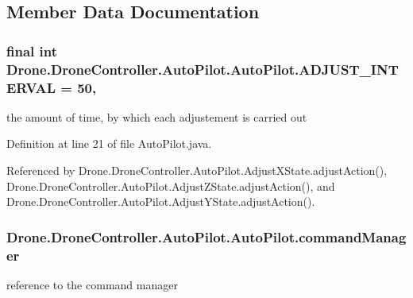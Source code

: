 \subsection{Member Data Documentation}
\hypertarget{class_drone_1_1_drone_controller_1_1_auto_pilot_1_1_auto_pilot_a07ecba3a82d5a8c611c15c62db622622}{}
\subsubsection[{A\+D\+J\+U\+S\+T\+\_\+\+I\+N\+T\+E\+R\+V\+A\+L}]{\setlength{\rightskip}{0pt plus 5cm}final int Drone.\+Drone\+Controller.\+Auto\+Pilot.\+Auto\+Pilot.\+A\+D\+J\+U\+S\+T\+\_\+\+I\+N\+T\+E\+R\+V\+A\+L = 50\hspace{0.3cm}{\ttfamily [static]}, {\ttfamily [protected]}}\label{class_drone_1_1_drone_controller_1_1_auto_pilot_1_1_auto_pilot_a07ecba3a82d5a8c611c15c62db622622}
the amount of time, by which each adjustement is carried out 

Definition at line 21 of file Auto\+Pilot.\+java.



Referenced by Drone.\+Drone\+Controller.\+Auto\+Pilot.\+Adjust\+X\+State.\+adjust\+Action(), Drone.\+Drone\+Controller.\+Auto\+Pilot.\+Adjust\+Z\+State.\+adjust\+Action(), and Drone.\+Drone\+Controller.\+Auto\+Pilot.\+Adjust\+Y\+State.\+adjust\+Action().

\hypertarget{class_drone_1_1_drone_controller_1_1_auto_pilot_1_1_auto_pilot_a7368a23d40f51be57aa4506ee2e6ea16}{}
\subsubsection[{command\+Manager}]{ Drone.\+Drone\+Controller.\+Auto\+Pilot.\+Auto\+Pilot.\+command\+Manager\hspace{0.3cm}{\ttfamily [protected]}}\label{class_drone_1_1_drone_controller_1_1_auto_pilot_1_1_auto_pilot_a7368a23d40f51be57aa4506ee2e6ea16}
reference to the command manager 

